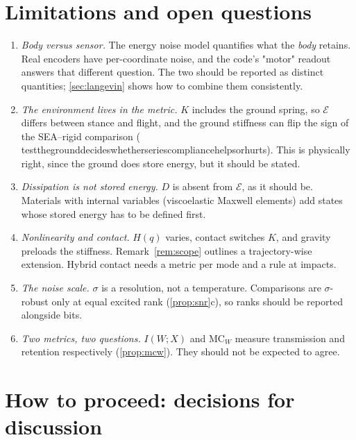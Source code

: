 \documentclass[11pt]{article}
\theoremstyle{definition}
\theoremstyle{remark}
\newcommand{\Em}{\mathcal{E}}         %
\newcommand{\codeus}{\textunderscore\allowbreak}
\newcommand{\code}[1]{{\ttfamily\let\_\codeus\hyphenchar\font=-1 #1}}
\begin{document}
\section{Limitations and open questions}
\label{sec:limits}
\begin{enumerate}
  \item \emph{Body versus sensor.} The energy noise model quantifies what the
        \emph{body} retains. Real encoders have per-coordinate noise, and the code's
        \code{"motor"} readout answers that different question. The two should be
        reported as distinct quantities; \cref{sec:langevin} shows how to combine them
        consistently.
  \item \emph{The environment lives in the metric.} $K$ includes the ground spring, so
        $\Em$ differs between stance and flight, and the ground stiffness can flip the
        sign of the SEA--rigid comparison
        (\code{test\_the\_ground\_decides\_whether\_series\_compliance\_helps\_or\_hurts}).
        This is physically right, since the ground does store energy, but it should be
        stated.
  \item \emph{Dissipation is not stored energy.} $D$ is absent from $\Em$, as it should
        be. Materials with internal variables (viscoelastic Maxwell elements) add states
        whose stored energy has to be defined first.
  \item \emph{Nonlinearity and contact.} $H(q)$ varies, contact switches $K$, and gravity
        preloads the stiffness. Remark~\ref{rem:scope} outlines a trajectory-wise
        extension. Hybrid contact needs a metric per mode and a rule at impacts.
  \item \emph{The noise scale.} $\sigma$ is a resolution, not a temperature. Comparisons
        are $\sigma$-robust only at equal excited rank (\cref{prop:snr}c), so ranks should
        be reported alongside bits.
  \item \emph{Two metrics, two questions.} $I(W;X)$ and $\mathrm{MC}_W$ measure
        transmission and retention respectively (\cref{prop:mcw}). They should not be
        expected to agree.
\end{enumerate}

\section{How to proceed: decisions for discussion}
\label{sec:proceed}
\end{document}
